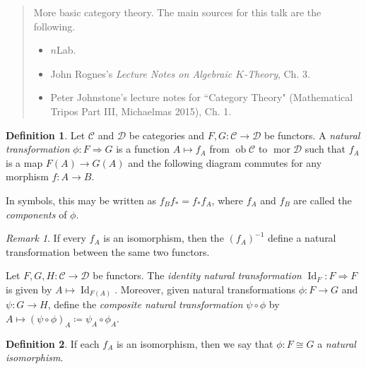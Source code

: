\documentclass[10pt,letterpaper,cm]{nupset}
\theoremstyle{definition}
\newtheorem{definition}{Definition}
\theoremstyle{theorem}
\theoremstyle{remark}
\newtheorem{remark}{Remark}
\newcommand{\1}{\mathbf{1}}
\renewcommand{\c}{\mathscr{C}}
\renewcommand{\d}{\mathscr{D}}
\newcommand{\0}{\vec 0}
\DeclareMathOperator{\id}{Id}
\DeclareMathOperator{\ob}{ob}
\DeclareMathOperator{\mor}{mor}
\begin{document}
\begin{abstract}
More basic category theory. The main sources for this talk are the following.
\begin{itemize}
\item $n$Lab.
\item John Rognes's \textit{Lecture Notes on Algebraic $K$-Theory}, Ch. 3.
\item Peter Johnstone's lecture notes for ``Category Theory" (Mathematical Tripos Part III, Michaelmas 2015), Ch. 1.
\end{itemize}
\end{abstract}

\begin{definition}
Let $\c$ and $\d$ be categories and $F,G: \c \to \d$ be functors.  A \textit{natural transformation} $\phi :F \Rightarrow G$  is a function $A \mapsto f_A$ from $\ob \c$ to $\mor \d$ such that $f_A$ is a map  $F(A) \to G(A)$ and the following diagram commutes for any morphism $f: A \to B$.

\begin{center}
\end{center}
In symbols, this may be written as $f_Bf_{\ast} = f_{\ast}f_A$, where $f_A$ and $f_B$ are called the \textit{components} of $\phi$.
\end{definition}

\begin{remark}\label{rmk}
If every $f_A$ is an isomorphism, then the $(f_A)^{{-}1}$ define a natural transformation between the same two functors.
\end{remark}

\smallskip

Let $F, G, H: \c \to \d$ be functors. The \textit{identity natural transformation} $\id_F : F \Rightarrow F$ is given by $A \mapsto \id_{F(A)}$. Moreover, given natural transformations $\phi: F \to G$ and $\psi: G \to H$, define the \textit{composite natural transformation} $\psi \circ \phi$ by $A \mapsto (\psi \circ \phi)_A \coloneqq \psi_{A} \circ \phi_{A}$.



\begin{definition}
If each $f_A$ is an isomorphism, then we say that $\phi: F \cong G$ a \textit{natural isomorphism}.
\end{definition}
\end{document}
